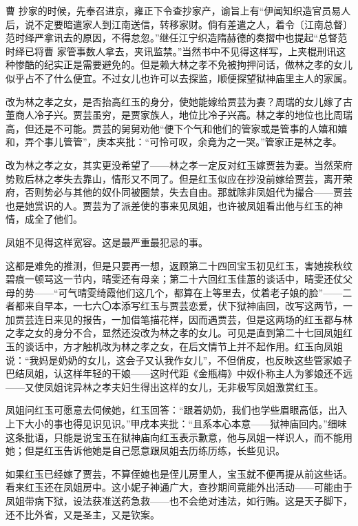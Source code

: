 \par 曹 抄家的时候，先奉召进京，雍正下令查抄家产，谕旨上有“伊闻知织造官员易人后，说不定要暗遣家人到江南送信，转移家财。倘有差遣之人，着令〔江南总督〕范时绎严拿讯去的原因，不得怠忽。”继任江宁织造隋赫德的奏摺中也提起“总督范时绎已将曹 家管事数人拿去，夹讯监禁。”当然书中不见得这样写，上夹棍刑讯这种惨酷的纪实正是需要避免的。但是赖大林之孝不免被拘押问话，做林之孝的女儿似乎占不了什么便宜。不过女儿也许可以去探监，顺便探望狱神庙里主人的家属。
\par 改为林之孝之女，是否抬高红玉的身分，使她能嫁给贾芸为妻？周瑞的女儿嫁了古董商人冷子兴。贾芸虽穷，是贾家族人，地位比冷子兴高。林之孝的地位也比周瑞高，但还是不可能。贾芸的舅舅劝他“便下个气和他们的管家或是管事的人嬉和嬉和，弄个事儿管管”，庚本夹批：“可怜可叹，余竟为之一哭。”管家正是林之孝。
\par 改为林之孝之女，其实更没希望了——林之孝一定反对红玉嫁贾芸为妻。当然荣府势败后林之孝失去靠山，情形又不同了。但是红玉似应在抄没前嫁给贾芸，离开荣府，否则势必与其他的奴仆同被圈禁，失去自由。那就除非凤姐代为撮合——贾芸也是她赏识的人。贾芸为了派差使的事来见凤姐，也许被凤姐看出他与红玉的神情，成全了他们。
\par 凤姐不见得这样宽容。这是最严重最犯忌的事。
\par 这都是难免的推测，但是只要再一想，返顾第二十四回宝玉初见红玉，害她挨秋纹碧痕一顿骂这一节内，晴雯还有母亲；第二十六回红玉佳蕙的谈话中，晴雯还仗父母的势——“可气晴雯绮霞他们这几个，都算在上等里去，仗着老子娘的脸”——二者都来自早本，一七六〇本添写红玉与贾芸恋爱，伏下狱神庙回，改写这两节，一加贾芸连日来见的报告，一加借笔描花样，因而遇贾芸，但是这两场的红玉都与林之孝之女的身分不合，显然还没改为林之孝的女儿。可见是直到第二十七回凤姐红玉的谈话中，方才触机改为林之孝之女，在后文情节上并不起作用。红玉向凤姐说：“我妈是奶奶的女儿，这会子又认我作女儿”，不但俏皮，也反映这些管家娘子巴结凤姐，认这样年轻的干娘——这时代距《金瓶梅》中奴仆称主人为爹娘还不远——又使凤姐诧异林之孝夫妇生得出这样的女儿，无非极写凤姐激赏红玉。
\par 凤姐问红玉可愿意去伺候她，红玉回答：“跟着奶奶，我们也学些眉眼高低，出入上下大小的事也得见识见识。”甲戌本夹批：“且系本心本意——狱神庙回内。”细味这条批语，只能是说宝玉在狱神庙向红玉表示歉意，他与凤姐一样识人，而不能用她；但是红玉告诉他她是自己愿意跟凤姐去历练历练，长些见识。
\par 如果红玉已经嫁了贾芸，不算侄媳也是侄儿房里人，宝玉就不便再提从前这些话。看来红玉还在凤姐房中。这小妮子神通广大，查抄期间竟能外出活动——可能由于凤姐带病下狱，设法获准送药急救——也不会绝对违法，如行贿。这是天子脚下，还不比外省，又是圣主，又是钦案。
